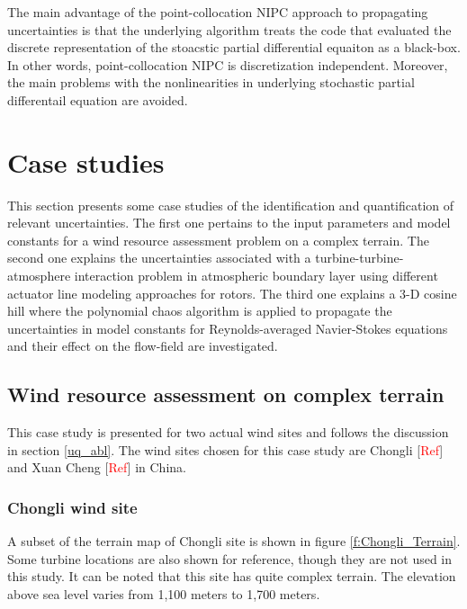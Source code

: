 \documentclass[]{aiaa-tc}%
\begin{document}
The main advantage of the point-collocation NIPC approach to propagating uncertainties is that the underlying algorithm treats the code that evaluated the discrete representation of the stoacstic partial differential equaiton as a black-box. In other words, point-collocation NIPC is discretization independent. Moreover, the main problems with the nonlinearities in underlying stochastic partial differentail equation are avoided.



\section{Case studies} \label{case_studies}

This section presents some case studies of the identification and quantification of relevant uncertainties. The first one pertains to the input parameters and model constants for a wind resource assessment problem on a complex terrain. The second one explains the uncertainties associated with a turbine-turbine-atmosphere interaction problem in atmospheric boundary layer using different actuator line modeling approaches for rotors. The third one explains a 3-D cosine hill where the polynomial chaos algorithm is applied to propagate the uncertainties in model constants for Reynolds-averaged Navier-Stokes equations and their effect on the flow-field are investigated.

\subsection{Wind resource assessment on complex terrain} \label{case_wra}
This case study is presented for two actual wind sites and follows the discussion in section \ref{uq_abl}. The wind sites chosen for this case study are Chongli [\textcolor{red}{Ref}] and Xuan Cheng  [\textcolor{red}{Ref}] in China. 

\subsubsection{Chongli wind site} \label{Chongli}

A subset of the terrain map of Chongli site is shown in figure \ref{f:Chongli_Terrain}. Some turbine locations are also shown for reference, though they are not used in this study. It can be noted that this site has quite complex terrain. The elevation above sea level varies from 1,100 meters to 1,700 meters. 
\end{document}

